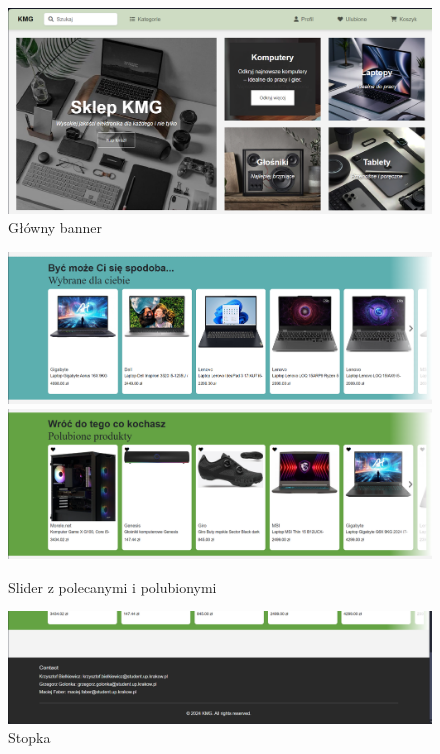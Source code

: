 \documentclass[12pt,a4paper,oneside]{article}
\theoremstyle{definition}
\numberwithin{equation}{section}
\begin{document}
    \begin{figure}[H]
        \centering
        \includegraphics[width=0.8\columnwidth]{images/krzysztofBImages/main-banner.png}
        \caption{Główny banner}
        \label{main-banner}
    \end{figure}

    \begin{figure}[H]
        \centering
        \includegraphics[width=0.7\columnwidth]{images/krzysztofBImages/slider-polecane.png}
        \includegraphics[width=0.7\columnwidth]{images/krzysztofBImages/slider-ulubione.png}
        \caption{Slider z polecanymi i polubionymi}
        \label{Slider}
    \end{figure}

    \begin{figure}[H]
        \centering
        \includegraphics[width=0.7\columnwidth]{images/krzysztofBImages/footer.png}
        \caption{Stopka}
        \label{Stopka}
    \end{figure}
\end{document}
